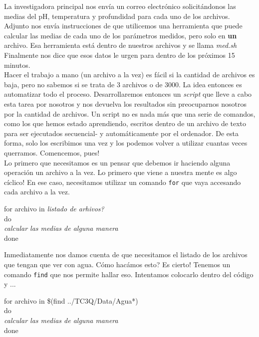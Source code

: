 \documentclass[10pt,letterpaper]{article}
\newcommand{\inlinecode}[1]{
\colorbox{light-gray}{\texttt{#1}}
}
\newenvironment{Code}
{
\begin{lrbox}{\selvestebox}%
\begin{minipage}{\dimexpr\columnwidth-2\fboxsep\relax}
\fontfamily{\ttdefault}\selectfont
}
{\end{minipage}\end{lrbox}%
\begin{center}
\colorbox{light-gray}{\usebox{\selvestebox}}
\end{center}
}
\begin{document}
La investigadora principal nos env\'ia un correo electr\'onico solicit\'andonos las medias del pH, temperatura y profundidad para cada uno de los archivos. Adjunto nos env\'ia instrucciones de que utilicemos una herramienta que puede calcular las medias de cada uno de los par\'ametros medidos, pero solo en \textbf{un} archivo. Esa herramienta est\'a dentro de nuestros archivos y se llama \emph{med.sh} Finalmente nos dice que esos datos le urgen para dentro de los pr\'oximos 15 minutos.\\

Hacer el trabajo a mano (un archivo a la vez) es f\'acil si la cantidad de archivos es baja, pero no sabemos si se trata de 3 archivos o de 3000. La idea entonces es automatizar todo el proceso. Desarrollaremos entonces un \emph{script} que lleve a cabo esta tarea por nosotros y nos devuelva los resultados sin preocuparnos nosotros por la cantidad de archivos. Un script no es nada m\'as que una serie de comandos, como los que hemos estado aprendiendo, escritos dentro de un archivo de texto para ser ejecutados secuencial- y autom\'aticamente por el ordenador. De esta forma, solo los escribimos una vez y los podemos volver a utilizar cuantas veces querramos. Comencemos, pues!\\

Lo primero que necesitamos es un pensar que debemos ir haciendo alguna operaci\'on un archivo a la vez. Lo primero que viene a nuestra mente es algo c\'iclico! En ese caso, necesitamos utilizar un comando \inlinecode{for} que vaya accesando cada archivo a la vez.

\begin{Code}
for archivo in \emph{listado de arhivos?}\\
do\\
\emph{calcular las medias de alguna manera}\\
done
\end{Code}

Inmediatamente nos damos cuenta de que necesitamos el listado de los archivos que tengan que ver con agua. C\'omo hac\'amos esto? Es cierto! Tenemos un comando \inlinecode{find} que nos permite hallar eso. Intentamos colocarlo dentro del c\'odigo y ...

\begin{Code}
for archivo in \$(find ../TC3Q/Data/Agua*)\\
do\\
\emph{calcular las medias de alguna manera}\\
done
\end{Code}
\end{document}
